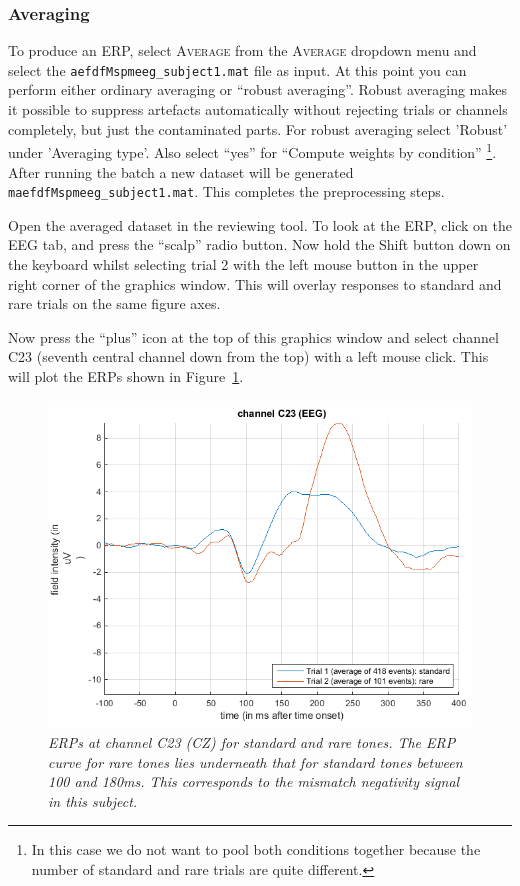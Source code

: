\subsubsection{Averaging}
To produce an ERP, select  \textsc{Average} from the  \textsc{Average} dropdown menu and select the \texttt{aefdfMspmeeg\_subject1.mat} file as input. At this point you can perform either ordinary averaging or ``robust averaging''. Robust averaging makes it possible to suppress artefacts automatically without rejecting trials or channels completely, but just the contaminated parts. For robust averaging select 'Robust' under 'Averaging type'.  Also select ``yes'' for ``Compute weights by condition'' \footnote{In this case we do not want to pool both conditions together because the number of standard and rare trials are quite different.}. After running the batch a new dataset will be generated \texttt{maefdfMspmeeg\_subject1.mat}. This completes the preprocessing steps.

Open the averaged dataset in the reviewing tool. To look at the ERP, click on the EEG tab, and press the ``scalp'' radio button. Now hold  the Shift button down on the keyboard whilst selecting trial 2 with the left mouse button in the upper right corner of the graphics window. This will overlay responses to standard and rare trials on the same figure axes.

Now press the ``plus'' icon at the top of this graphics window and select channel C23 (seventh central channel down from the top) with a left mouse click. This will plot the ERPs shown in Figure~\ref{c23}. 
\begin{figure}
\begin{center}
\includegraphics[width=120mm]{mmn/erp_c23}
\caption{\em ERPs at channel C23 (CZ) for standard and rare tones. The ERP curve for rare tones lies underneath that for standard tones between 100 and 180ms. This corresponds to the mismatch negativity signal in this subject. \label{c23}}
\end{center}
\end{figure}

